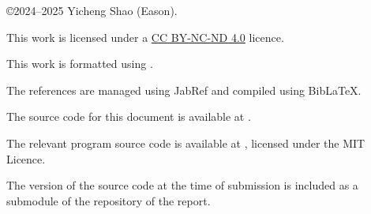 \noindent \copyright 2024--2025 Yicheng Shao (Eason).\nocite{*}

\noindent This work is licensed under a \href{https://creativecommons.org/licenses/by-nc-nd/4.0/}{CC BY-NC-ND 4.0} licence.

\noindent This work is formatted using \XeLaTeX.

\noindent The references are managed using JabRef \autocite{soft-jabref} and compiled using Bib\LaTeX.

\noindent The source code for this document is available at .

\noindent The relevant program source code is available at , licensed under the MIT Licence.

\noindent The version of the source code at the time of submission is included as a submodule of the repository of the report.